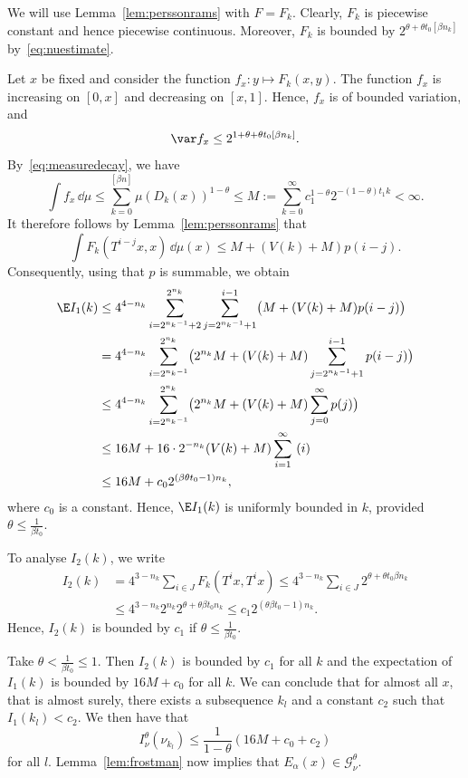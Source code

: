 We will use Lemma~\ref{lem:perssonrams} with $F = F_k$. Clearly, $F_k$ is piecewise constant and hence piecewise continuous. Moreover, $F_k$ is bounded by $2^{\theta + \theta t_0 [\beta n_k]}$ by~\eqref{eq:nuestimate}.

Let $x$ be fixed and consider the function $f_x \colon y \mapsto F_k (x,y)$. The function $f_x$ is increasing on $[0,x]$ and decreasing on $[x,1]$. Hence, $f_x$ is of bounded variation, and
\[
\var f_x \leq 2^{1 + \theta + \theta t_0 [\beta n_k]}.
\]
By~\eqref{eq:measuredecay}, we have
\[
\int f_x \, \dd\mu \leq \sum_{k=0}^{[\beta n]} \mu (D_k (x))^{1-\theta} \leq M := \sum_{k=0}^\infty c_1^{1-\theta} 2^{- (1-\theta) t_1 k} < \infty.
\]
It therefore follows by Lemma~\ref{lem:perssonrams} that
\[
\int F_k (T^{i-j} x, x) \, \dd \mu (x) \leq M + (V(k) + M) p (i-j).
\]
Consequently, using that $p$ is summable, we obtain
\begin{align*}
\E I_1 (k) &\leq 4^{4-n_k} \sum_{i=2^{n_k-1}+2}^{2^{n_k}}
\sum_{j=2^{n_k-1}+1}^{i-1} \bigl(M + (V(k) + M) p (i-j) \bigr)
\\ &= 4^{4-n_k} \sum_{i=2^{n_k-1}}^{2^{n_k}} \bigl(2^{n_k} M + (V(k) + M) \sum_{j=2^{n_k-1}+1}^{i-1} p (i-j) \bigr) \\ &\leq 4^{4-n_k} \sum_{i=2^{n_k-1}}^{2^{n_k}} \bigl(2^{n_k} M + (V(k) + M)
\sum_{j=0}^\infty p (j) \bigr) \\ &\leq 16 M + 16 \cdot 2^{-n_k} (V(k) + M) \sum_{i=1}^\infty~(i) \\ & \leq 16 M + c_0 2^{(\beta
\theta t_0 -1) n_k},
\end{align*}
where $c_0$ is a constant. Hence, $\E I_1 (k)$ is uniformly bounded in $k$, provided $\theta \leq
\frac{1}{\beta t_0}$.

To analyse $I_2 (k)$, we write
\begin{align*}
I_2 (k) &= 4^{3-n_k} \sum_{i \in J} F_k (T^i x, T^i x) \leq 4^{3-n_k} \sum_{i \in J} 2^{\theta + \theta t_0 \beta n_k} \\ &\leq 4^{3-n_k} 2^{n_k} 2^{\theta + \theta \beta t_0 n_k} \leq c_1 2^{(\theta \beta t_0 - 1) n_k}.
\end{align*}
Hence, $I_2 (k)$ is bounded by $c_1$ if $\theta \leq \frac{1}{\beta t_0}$.

Take $\theta < \frac{1}{\beta t_0} \leq 1$. Then $I_2 (k)$ is bounded by $c_1$ for all $k$ and the expectation of $I_1 (k)$ is bounded by $16M + c_0$ for all $k$. We can conclude that for almost all $x$, that is almost surely, there exists a subsequence $k_l$ and a constant $c_2$ such that $I_1 (k_l) < c_2$. We then have that
\[
I_\nu^\theta (\nu_{k_l}) \leq \frac{1}{1-\theta} (16M + c_0 + c_2)
\]
for all $l$. Lemma~\ref{lem:frostman} now implies that $E_\alpha (x)
\in \mathscr{G}_\nu^\theta$.

